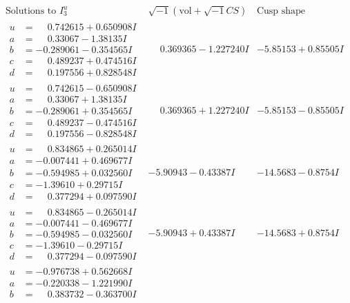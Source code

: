 \documentclass[1p]{elsarticle_modified}
\theoremstyle{definition}
\newcommand{\I}{\sqrt{-1}}
\begin{document}
$$\begin{array}{c|c|c}  
\text{Solutions to }I^u_{3}& \I (\text{vol} + \sqrt{-1}CS) & \text{Cusp shape}\\
 \hline 
\begin{aligned}
u &= \phantom{-}0.742615 + 0.650908 I \\
a &= \phantom{-}0.33067 - 1.38135 I \\
b &= -0.289061 - 0.354565 I \\
c &= \phantom{-}0.489237 + 0.474516 I \\
d &= \phantom{-}0.197556 + 0.828548 I\end{aligned}
 & \phantom{-}0.369365 - 1.227240 I & -5.85153 + 0.85505 I \\ \hline\begin{aligned}
u &= \phantom{-}0.742615 - 0.650908 I \\
a &= \phantom{-}0.33067 + 1.38135 I \\
b &= -0.289061 + 0.354565 I \\
c &= \phantom{-}0.489237 - 0.474516 I \\
d &= \phantom{-}0.197556 - 0.828548 I\end{aligned}
 & \phantom{-}0.369365 + 1.227240 I & -5.85153 - 0.85505 I \\ \hline\begin{aligned}
u &= \phantom{-}0.834865 + 0.265014 I \\
a &= -0.007441 + 0.469677 I \\
b &= -0.594985 + 0.032560 I \\
c &= -1.39610 + 0.29715 I \\
d &= \phantom{-}0.377294 + 0.097590 I\end{aligned}
 & -5.90943 - 0.43387 I & -14.5683 - 0.8754 I \\ \hline\begin{aligned}
u &= \phantom{-}0.834865 - 0.265014 I \\
a &= -0.007441 - 0.469677 I \\
b &= -0.594985 - 0.032560 I \\
c &= -1.39610 - 0.29715 I \\
d &= \phantom{-}0.377294 - 0.097590 I\end{aligned}
 & -5.90943 + 0.43387 I & -14.5683 + 0.8754 I \\ \hline\begin{aligned}
u &= -0.976738 + 0.562668 I \\
a &= -0.220338 - 1.221990 I \\
b &= \phantom{-}0.383732 - 0.363700 I \\

\end{aligned}
\end{array}$$
\end{document}
